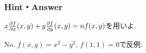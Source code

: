 \subsubsection{Hint・Answer}
{\small
\begin{probans}
\end{probans}

\begin{probans}
$x\frac{\partial f}{\partial x}(x,y) + y\frac{\partial f}{\partial y}(x,y) = nf(x,y)$を用いよ.
\end{probans}

\begin{probans}
No. $f(x,y) = x^2-y^2$, $f(1,1) = 0$で反例.
\end{probans}

\begin{probans}
\end{probans}

\begin{probans}
\end{probans}
}
